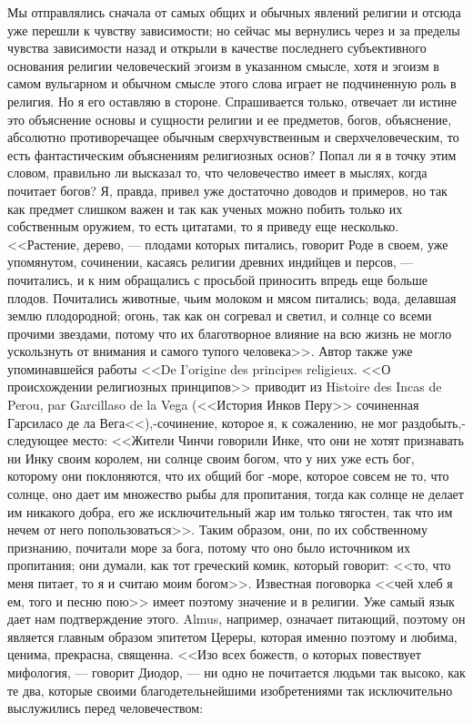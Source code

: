 \documentclass[12pt]{article}
\begin{document}
Мы отправлялись сначала от самых общих и обычных явлений религии и отсюда уже перешли к чувству зависимости; но сейчас мы вернулись через и за пределы чувства зависимости назад и открыли в качестве последнего субъективного основания религии человеческий эгоизм в указанном смысле, хотя и эгоизм в самом вульгарном и обычном смысле этого слова играет не подчиненную роль в религия. Но я его оставляю в стороне. Спрашивается только, отвечает ли истине это объяснение основы и сущности религии и ее предметов, богов, объяснение, абсолютно противоречащее обычным сверхчувственным и сверхчеловеческим, то есть фантастическим объяснениям религиозных основ? Попал ли я в точку этим словом, правильно ли высказал то, что человечество имеет в мыслях, когда почитает богов? Я, правда, привел уже достаточно доводов и примеров, но так как предмет слишком важен и так как ученых можно побить только их собственным оружием, то есть цитатами, то я приведу еще несколько. <<Растение, дерево, --- плодами которых питались, говорит Роде в своем, уже упомянутом, сочинении, касаясь религии древних индийцев и персов, --- почитались, и к ним обращались с просьбой приносить впредь еще больше плодов. Почитались животные, чьим молоком и мясом питались; вода, делавшая землю плодородной; огонь, так как он согревал и светил, и солнце со всеми прочими звездами, потому что их благотворное влияние на всю жизнь не могло ускользнуть от внимания и самого тупого человека>>. Автор также уже упоминавшейся работы <<De I'origine des principes religieux. <<О происхождении религиозных принципов>> приводит из Histoire des Incas de Perou, par Garcillaso de la Vega (<<История Инков Перу>>  сочиненная Гарсиласо де ла Вега<<),-сочинение, которое я, к сожалению, не мог раздобыть,-следующее место: <<Жители Чинчи говорили Инке, что они не хотят признавать ни Инку своим королем, ни солнце своим богом, что у них уже есть бог, которому они поклоняются, что их общий бог -море, которое совсем не то, что солнце, оно дает им множество рыбы для пропитания, тогда как солнце не делает им никакого добра, его же исключительный жар им только тягостен, так что им нечем от него попользоваться>>. Таким образом, они, по их собственному признанию, почитали море за бога, потому что оно было источником их пропитания; они думали, как тот греческий комик, который говорит: <<то, что меня питает, то я и считаю моим богом>>. Известная поговорка <<чей хлеб я ем, того и песню пою>>  имеет поэтому значение и в религии. Уже самый язык дает нам подтверждение этого. Almus, например, означает питающий, поэтому он является главным образом эпитетом Цереры, которая именно поэтому и любима, ценима, прекрасна, священна. <<Изо всех божеств, о которых повествует мифология, --- говорит Диодор, --- ни одно не почитается людьми так высоко, как те два, которые своими благодетельнейшими изобретениями так исключительно выслужились перед человечеством: 
\end{document}
